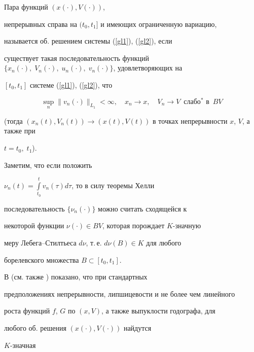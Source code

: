 \begin{defnnonum}


Пара функций $(x(\cdot), V(\cdot))$,


непрерывных справа на $(t_0,t_1]$ и имеющих ограниченную вариацию,


называется об. решением системы (\ref{gl1}), (\ref{gl2}), если


существует такая последовательность функций $\{x_n(\cdot),\;


V_n(\cdot),\; u_n(\cdot),\; v_n(\cdot)\}$, удовлетворяющих на


$[t_0,t_1]$ системе (\ref{gl1}), (\ref{gl2}), что


$$


\sup_n\|v_n(\cdot)\|_{L_1} < \infty, \quad x_n


\rightarrow x,\quad V_n \rightarrow V


\ \; \text{слабо$^*$ в}\ \; BV


$$


(тогда $(x_n(t),V_n(t)) \rightarrow


(x(t),V(t))$ в точках непрерывности $x$, $V$, а также при


$t=t_0,\; t_1$).


\end{defnnonum}





Заметим, что если положить


$\nu_n(t)=\int\limits_{t_0}^{t}v_n(\tau)d\tau$, то в силу теоремы Хелли


последовательность $\{\nu_n(\cdot)\}$ можно считать сходящейся к


некоторой функции $\nu (\cdot)\in BV$, которая порождает $K$-значную


меру Лебега--Стилтьеса $d\nu$, т.\,е. $d\nu(B)\in K$ для любого


борелевского множества $B\subset [t_0,t_1]$.





В \cite{M89} (см. также \cite{Zav-Ses}) показано, что при стандартных


предположениях непрерывности, липшицевости и не более чем линейного


роста функций $f$, $G$ по $(x,V)$, а также выпуклости годографа, для


любого об. решения $(x(\cdot), V(\cdot))$ найдутся


$K$-значная



